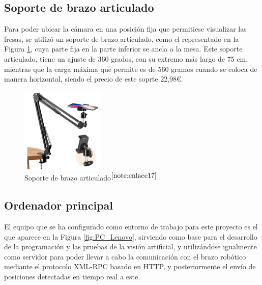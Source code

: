 \setcounter{footnote}{16}

\subsection{Soporte de brazo articulado}
\label{subsec:soporte_camara}

Para poder ubicar la cámara en una posición fija que permitiese visualizar las fresas, se utilizó un soporte de brazo articulado, como el representado en la Figura \ref{fig:soporte_camara}, cuya parte fija en la parte inferior se ancla a la mesa. Este soporte articulado, tiene un ajuste de 360 grados, con su extremo más largo de 75 cm, mientras que la carga máxima que permite es de 560 gramos cuando se coloca de manera horizontal, siendo el precio de este soprte 22,98€.

\begin{figure} [H]
    \begin{center}
      \includegraphics[width=4cm]{figs/Soporte de brazo articulado.jpeg}
    \end{center}
    \caption{Soporte de brazo articulado$^{\ref{note:enlace17}}$}
    \label{fig:soporte_camara}
\end{figure}
 
\setcounter{footnote}{17} 

\subsection{Ordenador principal}
\label{subsec:ordenador}

El equipo que se ha configurado como entorno de trabajo para este proyecto es el que aparece en la Figura \ref{fig:PC_Lenovo}, sirviendo como base para el desarrollo de la programación y las pruebas de la visión artificial, y utilizándose igualmente como servidor para poder llevar a cabo la comunicación con el brazo robótico mediante el protocolo XML-RPC basado en HTTP, y posteriormente el envío de posiciones detectadas en tiempo real a este. 

